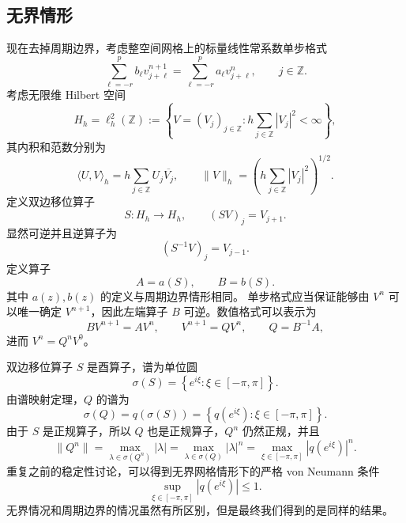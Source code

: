 \subsection*{无界情形}

现在去掉周期边界，考虑整空间网格上的标量线性常系数单步格式
\[
    \sum_{\ell=-r}^{p}b_\ell v_{j+\ell}^{n+1}
    =\sum_{\ell=-r}^{p}a_\ell v_{j+\ell}^n,
    \qquad j\in\mathbb Z.
\]
考虑无限维 Hilbert 空间
\[
    H_h=\ell_h^2(\mathbb Z)
    :=
    \left\{
    V=(V_j)_{j\in\mathbb Z}:
    h\sum_{j\in\mathbb Z}|V_j|^2<\infty
    \right\},
\]
其内积和范数分别为
\[
    \langle U,V\rangle_h
    =
    h\sum_{j\in\mathbb Z}U_j\overline{V_j},
    \qquad
    \|V\|_h
    =
    \left(
    h\sum_{j\in\mathbb Z}|V_j|^2
    \right)^{1/2}.
\]
定义双边移位算子
\[
    S:H_h\to H_h,
    \qquad
    (SV)_j=V_{j+1}.
\]
显然可逆并且逆算子为
\[
    (S^{-1}V)_j=V_{j-1}.
\]
定义算子
\[
    A=a(S),
    \qquad
    B=b(S).
\]
其中 $a(z), b(z)$ 的定义与周期边界情形相同。
单步格式应当保证能够由 $V^n$ 可以唯一确定 $V^{n+1}$，因此左端算子 $B$ 可逆。数值格式可以表示为
\[
    BV^{n+1}=AV^n,
    \qquad
    V^{n+1}=QV^n,
    \qquad
    Q=B^{-1}A,
\]
进而 $V^n=Q^nV^0$。

双边移位算子 $S$ 是酉算子，谱为单位圆
\[
    \sigma(S)
    =
    \left\{
    e^{i \xi}:
    \xi\in[-\pi,\pi]
    \right\}.
\]
由谱映射定理，$Q$ 的谱为
\[
    \sigma(Q)
    =
    q(\sigma(S))
    =
    \left\{
    q(e^{i \xi}):
    \xi\in[-\pi,\pi]
    \right\}.
\]
由于 $S$ 是正规算子，所以 $Q$ 也是正规算子，$Q^n$ 仍然正规，并且
\[
    \|Q^n\| = \max_{\lambda\in\sigma(Q^n)}|\lambda| = \max_{\lambda\in\sigma(Q)}|\lambda|^n = \max_{\xi\in[-\pi,\pi]}|q(e^{i\xi})|^n.
\]
重复之前的稳定性讨论，可以得到无界网格情形下的严格 von Neumann 条件
\[
    \sup_{\xi\in[-\pi,\pi]}
    |q(e^{i\xi})|
    \leq1.
\]
无界情况和周期边界的情况虽然有所区别，但是最终我们得到的是同样的结果。
